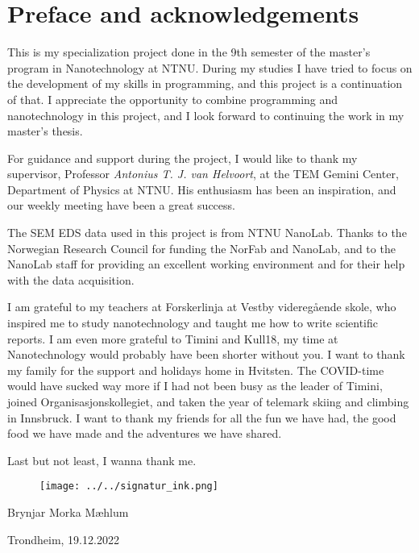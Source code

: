 \chapter*{Preface and acknowledgements}


This is my specialization project done in the 9th semester of the master's program in Nanotechnology at NTNU.
During my studies I have tried to focus on the development of my skills in programming, and this project is a continuation of that.
I appreciate the opportunity to combine programming and nanotechnology in this project, and I look forward to continuing the work in my master's thesis.

For guidance and support during the project, I would like to thank my supervisor, Professor \textit{Antonius T. J. van Helvoort}, at the TEM Gemini Center, Department of Physics at NTNU.
His enthusiasm has been an inspiration, and our weekly meeting have been a great success.

The SEM EDS data used in this project is from NTNU NanoLab.
Thanks to the Norwegian Research Council for funding the NorFab and NanoLab, and to the NanoLab staff for providing an excellent working environment and for their help with the data acquisition.


I am grateful to my teachers at Forskerlinja at Vestby videregående skole, who inspired me to study nanotechnology and taught me how to write scientific reports.
I am even more grateful to Timini and Kull18, my time at Nanotechnology would probably have been shorter without you.
I want to thank my family for the support and holidays home in Hvitsten.
The COVID-time would have sucked way more if I had not been busy as the leader of Timini, joined Organisasjonskollegiet, and taken the year of telemark skiing and climbing in Innsbruck.
I want to thank my friends for all the fun we have had, the good food we have made and the adventures we have shared.

Last but not least, I wanna thank me.


\begin{figure}[ht]
    \texttt{[image: ../../signatur\_ink.png]}
    \label{fig:signatur}
\end{figure}

Brynjar Morka Mæhlum

Trondheim, 19.12.2022
